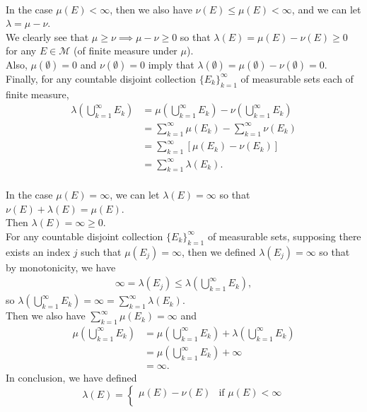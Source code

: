 \begin{enumerate}
\begin{enumerate}[label=(\roman*),align=left]
		\\In the case $\mu(E)<\infty$, then we also have $\nu(E)\le\mu(E)<\infty$, and we can let $\lambda = \mu-\nu$.
		\\We clearly see that $\mu\ge\nu\implies\mu-\nu\ge0$ so that $\lambda(E)=\mu(E)-\nu(E)\ge 0$ for any $E\in\mathcal{M}$ (of finite measure under $\mu$).
		\\Also, $\mu(\emptyset)= 0$ and $\nu(\emptyset)= 0$ imply that $\lambda(\emptyset)=\mu(\emptyset)-\nu(\emptyset)= 0$.
		\\Finally, for any countable disjoint collection $\{E_k\}_{k=1}^\infty$ of measurable sets each of finite measure,
		\begin{align*}
			\lambda\left(\bigcup_{k=1}^\infty E_k\right)&=\mu\left(\bigcup_{k=1}^\infty E_k\right)-\nu\left(\bigcup_{k=1}^\infty E_k\right)\\
			&=\sum_{k=1}^\infty\mu(E_k)-\sum_{k=1}^\infty\nu(E_k)\\
			&=\sum_{k=1}^\infty[\mu(E_k)-\nu(E_k)]\\
			&=\sum_{k=1}^\infty\lambda(E_k).
		\end{align*}
		\\In the case $\mu(E)=\infty$, we can let $\lambda(E) = \infty$ so that $\nu(E)+\lambda(E)=\mu(E)$.
		\\Then $\lambda(E)=\infty\ge0$.
		\\For any countable disjoint collection $\{E_k\}_{k=1}^\infty$ of measurable sets, supposing there exists an index $j$ such that $\mu(E_j)=\infty$, then we defined $\lambda(E_j) = \infty$ so that by monotonicity, we have
		\begin{align*}
			\infty=\lambda(E_j)\le\lambda\left(\bigcup_{k=1}^\infty E_k\right),
		\end{align*}
		so $\lambda\left(\bigcup_{k=1}^\infty E_k\right)=\infty=\sum_{k=1}^\infty\lambda(E_k)$.
		\\Then we also have $\sum_{k=1}^\infty\mu(E_k)=\infty$ and 
		\begin{align*}
			\mu\left(\bigcup_{k=1}^\infty E_k\right)&=\mu\left(\bigcup_{k=1}^\infty E_k\right)+\lambda\left(\bigcup_{k=1}^\infty E_k\right)\\
			&=\mu\left(\bigcup_{k=1}^\infty E_k\right)+\infty\\
			&=\infty.
		\end{align*}
		In conclusion, we have defined
		\[
		\lambda(E)=
		\begin{cases}
			\mu(E)-\nu(E)&\text{if }\mu(E)<\infty\\\

\end{cases}\]
\end{enumerate}
\end{enumerate}
